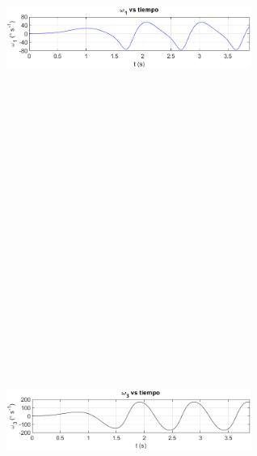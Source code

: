 \documentclass[12pt]{article}
\begin{document}
\begin{multicols}{2}
\begin{figure} [H]
    \end{figure}
    \vspace{-25pt}
        \begin{figure} [H]
        \centerline{\includegraphics[width=8cm, height=12cm,keepaspectratio]{NR Simultaneo/w1.png}}
    \end{figure}
        \vspace{-25pt}
        \begin{figure} [H]
        \centerline{\includegraphics[width=8cm, height=12cm,keepaspectratio]{NR Simultaneo/w3.png}}

\end{figure}
\end{multicols}
\end{document}
